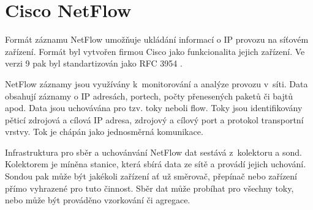  \newpage
\section{Cisco NetFlow}
\label{netflow}

Formát záznamu NetFlow umožňuje ukládání informací o IP provozu na síťovém zařízení. Formát byl
 vytvořen firmou Cisco jako funkcionalita jejich zařízení. Ve verzi 9 pak byl standartizován
 jako RFC 3954 \cite{rfc3954}.

NetFlow záznamy jsou využívány k~monitorování a analýze provozu v~síti. Data obsahují záznamy
 o IP adresách, portech, počty přenesených paketů či bajtů apod. Data jsou uchovávána pro
 tzv. toky neboli flow. Toky jsou identifikovány pěticí zdrojová a cílová IP adresa,
 zdrojový a cílový port a protokol transportní vrstvy. Tok je chápán jako jednosměrná komunikace.

Infrastruktura pro sběr a uchovánvání NetFlow dat sestává z~kolektoru a sond. Kolektorem je míněna
 stanice, která sbírá data ze sítě a provádí jejich uchování. Sondou pak může být jakékoli zařízení
 ať už směrovač, přepínač nebo zařízení přímo vyhrazené pro tuto činnost. Sběr dat může probíhat
 pro všechny toky, nebo může být prováděno vzorkování či agregace. 

